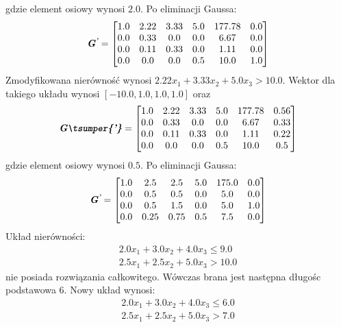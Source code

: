 gdzie element osiowy wynosi $2.0$. Po eliminacji Gaussa:
\begin{equation*}
  \textbf{\textit{G\textsuperscript{'}}} =
  \begin{bmatrix}
    1.0 & 2.22 & 3.33 & 5.0 & 177.78 & 0.0 \\
    0.0 & 0.33 & 0.0 & 0.0 & 6.67 & 0.0 \\
    0.0 & 0.11 & 0.33 & 0.0 & 1.11 & 0.0 \\
    0.0 & 0.0 & 0.0 & 0.5 & 10.0 & 1.0
  \end{bmatrix}
\end{equation*}
Zmodyfikowana nierówność wynosi $ 2.22 x_{1}+ 3.33 x_{2}+ 5.0 x_{3} > 10.0$. Wektor  dla takiego układu wynosi $[-10.0,1.0,1.0,1.0]$ oraz
\begin{equation*}
  \mf{G\tsumper{'}} =
  \begin{bmatrix}
    1.0 & 2.22 & 3.33 & 5.0 & 177.78 & 0.56 \\
    0.0 & 0.33 & 0.0 & 0.0 & 6.67 & 0.33 \\
    0.0 & 0.11 & 0.33 & 0.0 & 1.11 & 0.22 \\
    0.0 & 0.0 & 0.0 & 0.5 & 10.0 & 0.5
  \end{bmatrix}
\end{equation*}
gdzie element osiowy wynosi $0.5$. Po eliminacji Gaussa:
\begin{equation*}
  \textbf{\textit{G\textsuperscript{'}}} =
  \begin{bmatrix}
    1.0 & 2.5 & 2.5 & 5.0 & 175.0 & 0.0 \\
    0.0 & 0.5 & 0.5 & 0.0 & 5.0 & 0.0 \\
    0.0 & 0.5 & 1.5 & 0.0 & 5.0 & 1.0 \\
    0.0 & 0.25 & 0.75 & 0.5 & 7.5 & 0.0
  \end{bmatrix}
\end{equation*}
Układ nierówności:
\begin{equation*}
  \begin{aligned}
    2.0 x_{1}+ 3.0 x_{2}+ 4.0 x_{3} \le 9.0 \\
    2.5 x_{1}+ 2.5 x_{2}+ 5.0 x_{3} > 10.0
  \end{aligned}
\end{equation*}
nie posiada rozwiązania całkowitego. Wówczas brana jest następna długośc podstawowa 6. Nowy układ wynosi:
\begin{equation*}
  \begin{aligned}
    2.0 x_{1}+ 3.0 x_{2}+ 4.0 x_{3} \le 6.0 \\
    2.5 x_{1}+ 2.5 x_{2}+ 5.0 x_{3} > 7.0
  \end{aligned}
\end{equation*}
